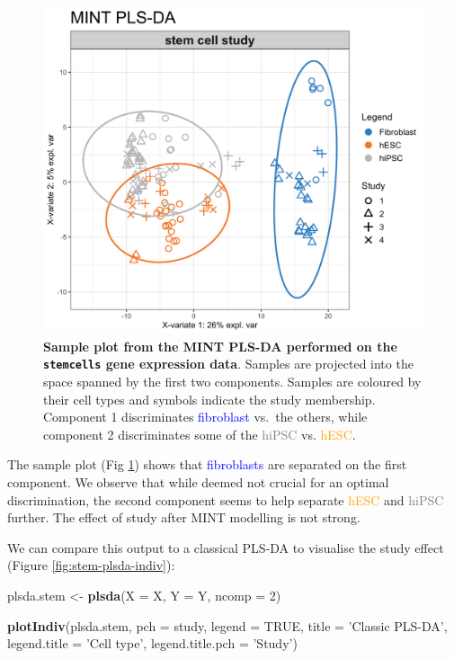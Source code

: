 \documentclass[]{book}
\newenvironment{Shaded}{\begin{snugshade}}{\end{snugshade}}
\newcommand{\DataTypeTok}[1]{\textcolor[rgb]{0.13,0.29,0.53}{#1}}
\newcommand{\DecValTok}[1]{\textcolor[rgb]{0.00,0.00,0.81}{#1}}
\newcommand{\KeywordTok}[1]{\textcolor[rgb]{0.13,0.29,0.53}{\textbf{#1}}}
\newcommand{\NormalTok}[1]{#1}
\newcommand{\OtherTok}[1]{\textcolor[rgb]{0.56,0.35,0.01}{#1}}
\newcommand{\StringTok}[1]{\textcolor[rgb]{0.31,0.60,0.02}{#1}}
\begin{document}
\begin{figure}

{\centering \includegraphics[width=0.5\linewidth]{Figures/MINT/MINT-plsda-indiv-1} 

}

\caption{\textbf{Sample plot from the MINT PLS-DA performed on the \texttt{stemcells} gene expression data}. Samples are projected into the space spanned by the first two components. Samples are coloured by their cell types and symbols indicate the study membership. Component 1 discriminates \textcolor{blue}{fibroblast} vs.~the others, while component 2 discriminates some of the \textcolor{grey}{hiPSC} vs. \textcolor{orange}{hESC}.}\label{fig:MINT-plsda-indiv}
\end{figure}



The sample plot (Fig \ref{fig:MINT-plsda-indiv}) shows that \textcolor{blue}{fibroblasts} are separated on the first component. We observe that while deemed not crucial for an optimal discrimination, the second component seems to help separate \textcolor{orange}{hESC} and \textcolor{grey}{hiPSC} further. The effect of study after MINT modelling is not strong.

We can compare this output to a classical PLS-DA to visualise the study effect (Figure \ref{fig:stem-plsda-indiv}):

\begin{Shaded}
\begin{Highlighting}[]
\NormalTok{plsda.stem <-}\StringTok{ }\KeywordTok{plsda}\NormalTok{(}\DataTypeTok{X =}\NormalTok{ X, }\DataTypeTok{Y =}\NormalTok{ Y, }\DataTypeTok{ncomp =} \DecValTok{2}\NormalTok{)}

\KeywordTok{plotIndiv}\NormalTok{(plsda.stem, }\DataTypeTok{pch =}\NormalTok{ study,}
          \DataTypeTok{legend =} \OtherTok{TRUE}\NormalTok{, }\DataTypeTok{title =} \StringTok{'Classic PLS-DA'}\NormalTok{,}
          \DataTypeTok{legend.title =} \StringTok{'Cell type'}\NormalTok{, }\DataTypeTok{legend.title.pch =} \StringTok{'Study'}\NormalTok{)}
\end{Highlighting}
\end{Shaded}
\end{document}
